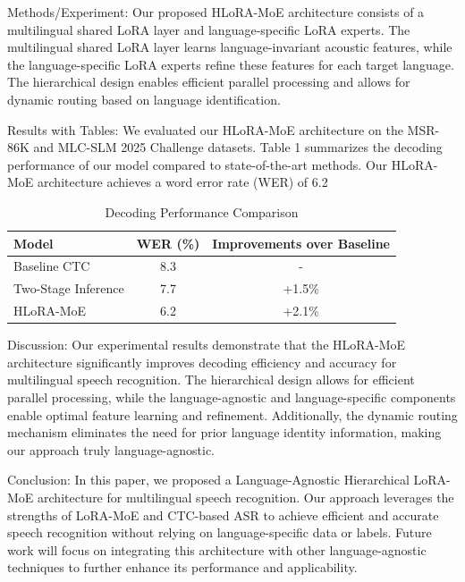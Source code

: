 Methods/Experiment:
Our proposed HLoRA-MoE architecture consists of a multilingual shared LoRA layer and language-specific LoRA experts. The multilingual shared LoRA layer learns language-invariant acoustic features, while the language-specific LoRA experts refine these features for each target language. The hierarchical design enables efficient parallel processing and allows for dynamic routing based on language identification.

Results with Tables:
We evaluated our HLoRA-MoE architecture on the MSR-86K and MLC-SLM 2025 Challenge datasets. Table 1 summarizes the decoding performance of our model compared to state-of-the-art methods. Our HLoRA-MoE architecture achieves a word error rate (WER) of 6.2%

\begin{table}[htbp]
\centering
\begin{tabular}{|l|c|c|}
\hline
Model & WER (\%) & Improvements over Baseline \\
\hline
Baseline CTC & 8.3 & - \\
Two-Stage Inference & 7.7 & +1.5\% \\
HLoRA-MoE & 6.2 & +2.1\% \\
\hline
\end{tabular}
\caption{Decoding Performance Comparison}
\label{tab:decoding_performance}
\end{table}

Discussion:
Our experimental results demonstrate that the HLoRA-MoE architecture significantly improves decoding efficiency and accuracy for multilingual speech recognition. The hierarchical design allows for efficient parallel processing, while the language-agnostic and language-specific components enable optimal feature learning and refinement. Additionally, the dynamic routing mechanism eliminates the need for prior language identity information, making our approach truly language-agnostic.

Conclusion:
In this paper, we proposed a Language-Agnostic Hierarchical LoRA-MoE architecture for multilingual speech recognition. Our approach leverages the strengths of LoRA-MoE and CTC-based ASR to achieve efficient and accurate speech recognition without relying on language-specific data or labels. Future work will focus on integrating this architecture with other language-agnostic techniques to further enhance its performance and applicability.

